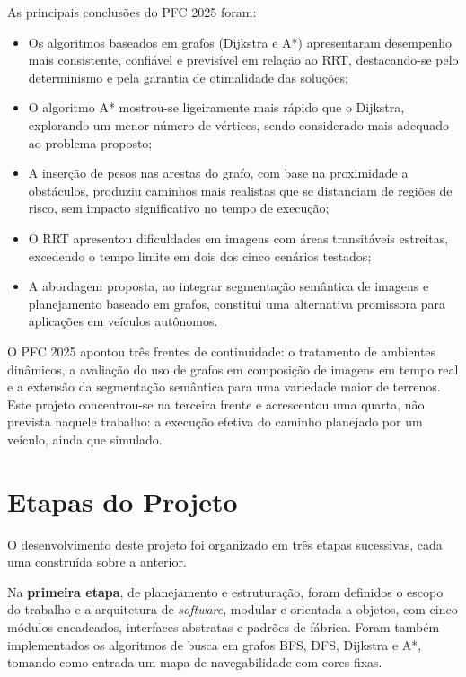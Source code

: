\documentclass[
    12pt,
    openright,
    oneside,
    a4paper,
    english,
    brazil
]{abntex2}
\begin{document}
As principais conclusões do PFC 2025 foram:

\begin{itemize}
    \item Os algoritmos baseados em grafos (Dijkstra e A*) apresentaram desempenho mais consistente, confiável e previsível em relação ao RRT, destacando-se pelo determinismo e pela garantia de otimalidade das soluções;
    \item O algoritmo A* mostrou-se ligeiramente mais rápido que o Dijkstra, explorando um menor número de vértices, sendo considerado mais adequado ao problema proposto;
    \item A inserção de pesos nas arestas do grafo, com base na proximidade a obstáculos, produziu caminhos mais realistas que se distanciam de regiões de risco, sem impacto significativo no tempo de execução;
    \item O RRT apresentou dificuldades em imagens com áreas transitáveis estreitas, excedendo o tempo limite em dois dos cinco cenários testados;
    \item A abordagem proposta, ao integrar segmentação semântica de imagens e planejamento baseado em grafos, constitui uma alternativa promissora para aplicações em veículos autônomos.
\end{itemize}

O PFC 2025 apontou três frentes de continuidade: o tratamento de ambientes dinâmicos, a avaliação do uso de grafos em composição de imagens em tempo real e a extensão da segmentação semântica para uma variedade maior de terrenos. Este projeto concentrou-se na terceira frente e acrescentou uma quarta, não prevista naquele trabalho: a execução efetiva do caminho planejado por um veículo, ainda que simulado.

\section{Etapas do Projeto}
\label{sec:evolucao}

O desenvolvimento deste projeto foi organizado em três etapas sucessivas, cada uma construída sobre a anterior.

Na \textbf{primeira etapa}, de planejamento e estruturação, foram definidos o escopo do trabalho e a arquitetura de \textit{software}, modular e orientada a objetos, com cinco módulos encadeados, interfaces abstratas e padrões de fábrica. Foram também implementados os algoritmos de busca em grafos BFS, DFS, Dijkstra e A*, tomando como entrada um mapa de navegabilidade com cores fixas.
\end{document}
